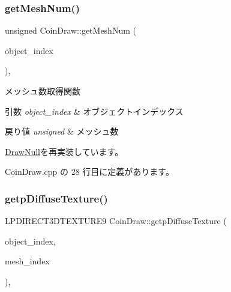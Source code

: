 \subsubsection{\texorpdfstring{get\+Mesh\+Num()}{getMeshNum()}}
{\footnotesize\ttfamily unsigned Coin\+Draw\+::get\+Mesh\+Num (\begin{DoxyParamCaption}\item[{unsigned}]{object\+\_\+index }\end{DoxyParamCaption})\hspace{0.3cm}{\ttfamily [override]}, {\ttfamily [virtual]}}



メッシュ数取得関数 


\begin{DoxyParams}{引数}
{\em object\+\_\+index} & オブジェクトインデックス \\
\hline
\end{DoxyParams}

\begin{DoxyRetVals}{戻り値}
{\em unsigned} & メッシュ数 \\
\hline
\end{DoxyRetVals}


\mbox{\hyperlink{class_draw_null_a4c566a37d27fac3dcf76c7970443f375}{Draw\+Null}}を再実装しています。



 Coin\+Draw.\+cpp の 28 行目に定義があります。

\mbox{\label{class_coin_draw_a38a4143f2e93a5b16d33ec94a188f4f6}} 
\subsubsection{\texorpdfstring{getp\+Diffuse\+Texture()}{getpDiffuseTexture()}}
{\footnotesize\ttfamily L\+P\+D\+I\+R\+E\+C\+T3\+D\+T\+E\+X\+T\+U\+R\+E9 Coin\+Draw\+::getp\+Diffuse\+Texture (\begin{DoxyParamCaption}\item[{unsigned}]{object\+\_\+index,  }\item[{unsigned}]{mesh\+\_\+index }\end{DoxyParamCaption})\hspace{0.3cm}{\ttfamily [override]}, {\ttfamily [virtual]}}



